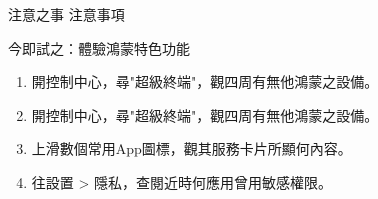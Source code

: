 \begin{tcbwarn}{注意之事}
注意事項

\end{tcbwarn}

\begin{tcbpractice}{今即試之：體驗鴻蒙特色功能}
\begin{enumerate}
  \item 開控制中心，尋"超級終端"，觀四周有無他鴻蒙之設備。
  \item 開控制中心，尋"超級終端"，觀四周有無他鴻蒙之設備。
  \item 上滑數個常用App圖標，觀其服務卡片所顯何內容。
  \item 往設置 > 隱私，查閱近時何應用曾用敏感權限。
\end{enumerate}

\end{tcbpractice}
